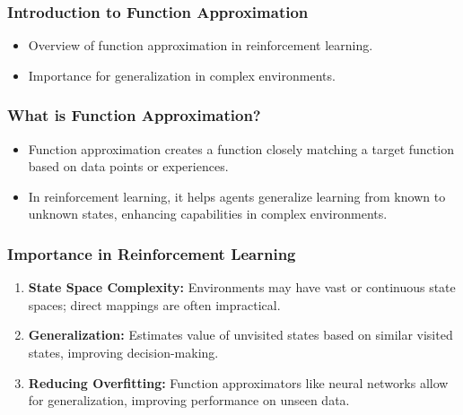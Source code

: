 \documentclass[aspectratio=169]{beamer}
\begin{document}
\frame{\titlepage}

\begin{frame}[fragile]
    \frametitle{Introduction to Function Approximation}
    \begin{itemize}
        \item Overview of function approximation in reinforcement learning.
        \item Importance for generalization in complex environments.
    \end{itemize}
\end{frame}

\begin{frame}[fragile]
    \frametitle{What is Function Approximation?}
    \begin{itemize}
        \item Function approximation creates a function closely matching a target function based on data points or experiences.
        \item In reinforcement learning, it helps agents generalize learning from known to unknown states, enhancing capabilities in complex environments.
    \end{itemize}
\end{frame}

\begin{frame}[fragile]
    \frametitle{Importance in Reinforcement Learning}
    \begin{enumerate}
        \item \textbf{State Space Complexity:} Environments may have vast or continuous state spaces; direct mappings are often impractical.
        \item \textbf{Generalization:} Estimates value of unvisited states based on similar visited states, improving decision-making.
        \item \textbf{Reducing Overfitting:} Function approximators like neural networks allow for generalization, improving performance on unseen data.
    \end{enumerate}
\end{frame}
\end{document}
